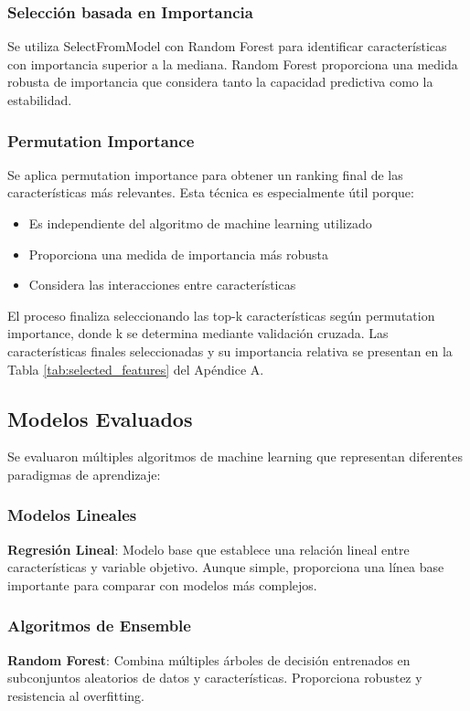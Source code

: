 \documentclass[conference]{IEEEtran}
\begin{document}
	\subsubsection{Selección basada en Importancia}
	Se utiliza SelectFromModel con Random Forest para identificar características con importancia superior a la mediana. Random Forest proporciona una medida robusta de importancia que considera tanto la capacidad predictiva como la estabilidad.
	
	\subsubsection{Permutation Importance}
	Se aplica permutation importance para obtener un ranking final de las características más relevantes. Esta técnica es especialmente útil porque:
	\begin{itemize}
		\item Es independiente del algoritmo de machine learning utilizado
		\item Proporciona una medida de importancia más robusta
		\item Considera las interacciones entre características
	\end{itemize}
	
	El proceso finaliza seleccionando las top-k características según permutation importance, donde k se determina mediante validación cruzada. Las características finales seleccionadas y su importancia relativa se presentan en la Tabla \ref{tab:selected_features} del Apéndice A.
	
	\subsection{Modelos Evaluados}
	Se evaluaron múltiples algoritmos de machine learning que representan diferentes paradigmas de aprendizaje:
	
	\subsubsection{Modelos Lineales}
	\textbf{Regresión Lineal}: Modelo base que establece una relación lineal entre características y variable objetivo. Aunque simple, proporciona una línea base importante para comparar con modelos más complejos.
	
	\subsubsection{Algoritmos de Ensemble}
	\textbf{Random Forest}: Combina múltiples árboles de decisión entrenados en subconjuntos aleatorios de datos y características. Proporciona robustez y resistencia al overfitting.
	
\end{document}
